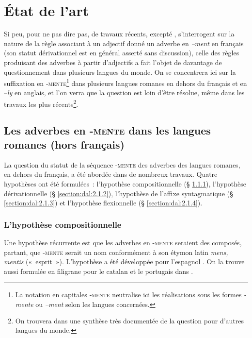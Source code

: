 \documentclass[output=paper]{langsci/langscibook}
\begin{document}
\section{État de l'art}

Si peu, pour ne pas dire pas, de travaux récents, excepté %
\citet{Dal07}%
%
, s'interrogent sur la nature de la règle associant à un adjectif donné un adverbe en \emph{--ment} en français (son statut dérivationnel est en général asserté sans discussion), celle des règles produisant des adverbes à partir d'adjectifs a fait l'objet de davantage de questionnement dans plusieurs langues du monde. On se concentrera ici sur la suffixation en ‑\textsc{mente}\footnote{La notation en capitales ‑\textsc{mente} neutralise ici les réalisations sous les formes \emph{-mente} ou \emph{--ment} selon les langues concernées.} dans plusieurs langues romanes en dehors du français et en --\emph{ly} en anglais, et l'on verra que la question est loin d'être résolue, même dans les travaux les plus récents\footnote{On trouvera dans %
\citet{Ricca15} %
%
une synthèse très documentée de la question pour d'autres langues du monde.}.

\subsection{Les adverbes en -\textsc{mente} dans les langues romanes (hors français)}

La question du statut de la séquence -\textsc{mente} des adverbes des langues romanes, en dehors du français, a été abordée dans de nombreux travaux. Quatre hypothèses ont été formulées~: l'hypothèse compositionnelle (§ \ref{section:dal:2.1.1}), l'hypothèse dérivationnelle (§ \ref{section:dal:2.1.2}), l'hypothèse de l'affixe syntagmatique (§ \ref{section:dal:2.1.3}) et l'hypothèse flexionnelle (§ \ref{section:dal:2.1.4}).

\subsubsection{L'hypothèse compositionnelle}\label{section:dal:2.1.1}


Une hypothèse récurrente est que les adverbes en -\textsc{mente} seraient des composés, partant, que -\textsc{mente} serait un nom conformément à son étymon latin \emph{mens, mentis} («~esprit~»). L'hypothèse a été développée pour l'espagnol %
\citep[cf., parmi d'autres][]{Bello1847,Hockett58,Seco72,Zagona90,Kovacci99}%
%
. On la trouve aussi formulée en filigrane pour le catalan et le portugais dans %
\citet{Chircu07}%
%
.
\end{document}
